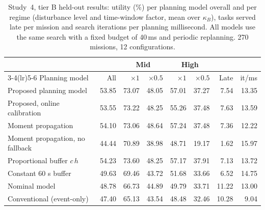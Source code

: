 \begin{table}[t]
\caption{Study~4, tier B held-out results: utility (\%) per planning model overall and per regime (disturbance level and time-window factor, mean over $\kappa_B$), tasks served late per mission and search iterations per planning millisecond. All models use the same search with a fixed budget of 40\,ms and periodic replanning. 270 missions, 12 configurations.}\label{tab:s4}
\centering\small
\begin{tabular}{lrrrrrrr}
\toprule
& & \multicolumn{2}{c}{Mid} & \multicolumn{2}{c}{High} & & \\
\cmidrule(lr){3-4}\cmidrule(lr){5-6}
Planning model & All & $\times 1$ & $\times 0.5$ & $\times 1$ & $\times 0.5$ & Late & it/ms \\
\midrule
Proposed planning model & 53.85 & 73.07 & 48.05 & 57.01 & 37.27 & 7.54 & 13.35 \\
Proposed, online calibration & 53.55 & 73.22 & 48.25 & 55.26 & 37.48 & 7.63 & 13.59 \\
Moment propagation & 54.10 & 73.06 & 48.64 & 57.24 & 37.48 & 7.36 & 12.22 \\
Moment propagation, no fallback & 44.44 & 70.89 & 38.98 & 48.71 & 19.17 & 1.62 & 15.97 \\
Proportional buffer $c\,h$ & 54.23 & 73.60 & 48.25 & 57.17 & 37.91 & 7.13 & 13.72 \\
Constant 60 s buffer & 49.63 & 69.46 & 43.72 & 51.68 & 33.66 & 6.52 & 14.75 \\
Nominal model & 48.78 & 66.73 & 44.89 & 49.79 & 33.71 & 11.22 & 13.00 \\
Conventional (event-only) & 47.40 & 65.13 & 43.54 & 48.48 & 32.46 & 10.28 & 9.04 \\
\bottomrule
\end{tabular}
\end{table}
